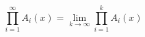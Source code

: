 

\setcounter{section}{3}
\setcounter{subsection}{4}
\setcounter{dfn}{8}

\begin{dfn}
\[
\prod_{i=1}^\infty A_i(x) = \lim_{k \to \infty} \prod_{i=1}^k A_i(x)
\]
\end{dfn}

